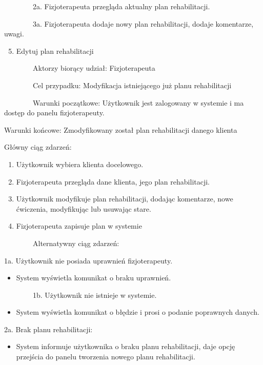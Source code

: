 {~~~~~~~~2a. Fizjoterapeuta przegląda aktualny plan rehabilitacji.}

{~~~~~~~~3a. Fizjoterapeuta dodaje nowy plan rehabilitacji, dodaje
komentarze, uwagi.}

{}

\begin{enumerate}
\setcounter{enumi}{4}
\tightlist
\item
  {Edytuj plan rehabilitacji}
\end{enumerate}

{~~~~~~~~}{Aktorzy biorący udział: Fizjoterapeuta}

{~~~~~~~~Cel przypadku: Modyfikacja istniejącego już planu
rehabilitacji}

{~~~~~~~~Warunki początkowe: Użytkownik jest zalogowany w systemie i ma
dostęp do panelu fizjoterapeuty.}

{Warunki końcowe: Zmodyfikowany został plan rehabilitacji danego
klienta}

{Główny ciąg zdarzeń:}

\begin{enumerate}
\tightlist
\item
  {Użytkownik wybiera klienta docelowego.}
\item
  {Fizjoterapeuta przegląda dane klienta, jego plan rehabilitacji.}
\item
  {Użytkownik modyfikuje plan rehabilitacji, dodając komentarze, nowe
  ćwiczenia, modyfikując lub usuwając stare.}
\item
  {Fizjoterapeuta zapisuje plan w systemie}
\end{enumerate}

{~~~~~~~~Alternatywny ciąg zdarzeń:}

{1a. Użytkownik nie posiada uprawnień fizjoterapeuty.}

\begin{itemize}
\tightlist
\item
  {System wyświetla komunikat o braku uprawnień.}
\end{itemize}

{~~~~~~~~1b. Użytkownik nie istnieje w systemie.}

\begin{itemize}
\tightlist
\item
  {System wyświetla komunikat o błędzie i prosi o podanie poprawnych
  danych.}
\end{itemize}

{2a. Brak planu rehabilitacji:}

\begin{itemize}
\tightlist
\item
  {System informuje użytkownika o braku planu rehabilitacji, daje opcję
  przejścia do panelu tworzenia nowego planu rehabilitacji.}
\end{itemize}

